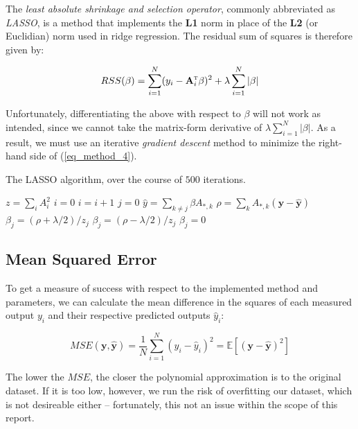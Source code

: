 \documentclass[a4paper,10pt,english]{article}
\begin{document}
	The \textit{least absolute shrinkage and selection operator}, commonly abbreviated as \textit{LASSO}, is a method that implements the \textbf{L1} norm in place of the \textbf{L2} (or Euclidian) norm used in ridge regression.  The residual sum of squares is therefore given by:
	
	\begin{equation}
	\label{eq_method_4}
	RSS(\beta) = \sum_{i=1}^N (y_i - \mathbf{A}_i^\textsc{t} \beta)^2 + \lambda \sum_{i=1}^N |\beta|
	\end{equation}
	
	Unfortunately, differentiating the above with respect to $\beta$ will not work as intended, since we cannot take the matrix-form derivative of $\lambda \sum_{i=1}^N |\beta|$.  As a result, we must use an iterative \textit{gradient descent} method to minimize the right-hand side of (\ref{eq_method_4}).
	
	\begin{algorithm}[H]
		\caption{The LASSO algorithm, over the course of $500$ iterations.}
		\begin{algorithmic}[1]
			\State $z = \sum_i A_i^2$
			\State $i = 0$
				\State $i = i + 1$
				\State $j = 0$
				\While{j < p}
					\State $\hat{y} = \sum_{k \neq j} \beta A_{*,k}$
					\State $\rho = \sum_k A_{*,k} (\mathbf{y} - \mathbf{\hat{y}})$
						\State $\beta_j = (\rho + \lambda/2)/z_j$
						\State $\beta_j = (\rho - \lambda/2)/z_j$
					\Else
						\State $\beta_j = 0$
					\EndIf
				\EndWhile		
			\EndWhile
		\end{algorithmic}
	\end{algorithm}
	
	\subsection*{Mean Squared Error}
	
	To get a measure of success with respect to the implemented method and parameters, we can calculate the mean difference in the squares of each measured output $y_i$ and their respective predicted outputs $\hat{y}_i$:
	
	\begin{equation}
	MSE(\mathbf{y}, \mathbf{\hat{y}}) = \frac{1}{N} \sum_{i=1}^{N} (y_i - \hat{y}_i)^2 = \mathbb{E}\left[(\mathbf{y}-\hat{\mathbf{y}})^{2}\right]
	\end{equation}
	
	The lower the $MSE$, the closer the polynomial approximation is to the original dataset.  If it is too low, however, we run the risk of overfitting our dataset, which is not desireable either – fortunately, this not an issue within the scope of this report.
	
\end{document}
